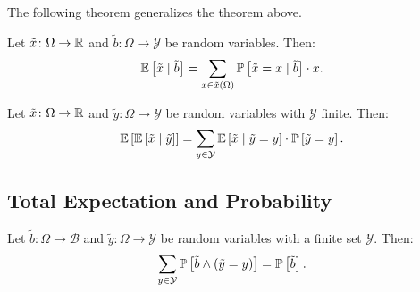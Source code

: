 The following theorem generalizes the theorem above. 
\begin{theorem}\label{thm:exp-sum-val-cnd}
Let $\tilde{x} \colon \Omega \to \mathbb{R}$ and $\tilde{b} \colon \Omega \to \mathcal{Y}$ be random variables. Then:
\[
  \mathbb{E} \left[ \tilde{x} \mid \tilde{b} \right] 
  =
  \sum_{x\in \tilde{x}(\Omega)} \mathbb{P} \left[ \tilde{x} = x \mid \tilde{b}  \right] \cdot x.
\]
\end{theorem}

\begin{theorem} \label{thm:exp-sum-val-cnd-rv}
Let $\tilde{x} \colon \Omega \to \mathbb{R}$ and $\tilde{y} \colon \Omega \to \mathcal{Y}$ be random variables with $\mathcal{Y}$ finite. Then:
\[
  \mathbb{E} \left[ \mathbb{E} \left[ \tilde{x} \mid  \tilde{y} \right] \right]
  =
  \sum_{y\in \mathcal{Y}} \mathbb{E} \left[ \tilde{x} \mid  \tilde{y} = y \right] \cdot
                       \mathbb{P}\left[ \tilde{y} = y \right].
\]
\end{theorem}


\subsection{Total Expectation and Probability}


\begin{theorem} \label{thm:total-probability}
Let $\tilde{b} \colon \Omega \to \mathcal{B}$ and $\tilde{y} \colon \Omega \to \mathcal{Y}$ be random variables with a finite set $\mathcal{Y}$. Then:
\[
\sum_{y\in \mathcal{Y}} \mathbb{P}\left[\tilde{b} \wedge (\tilde{y} = y) \right] = \mathbb{P} \left[ \tilde{b} \right].
\]
\end{theorem}


